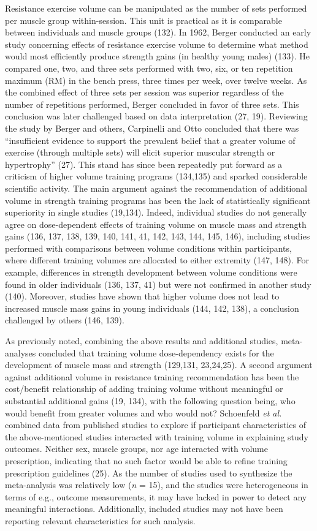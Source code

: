 \documentclass[twoside,10pt]{gihclass} %
\begin{document}
Resistance exercise volume can be manipulated as the number of sets performed per muscle group within-session. This unit is practical as it is comparable between individuals and muscle groups (132).
In 1962, Berger conducted an early study concerning effects of resistance exercise volume to determine what method would most efficiently produce strength gains (in healthy young males) (133). He compared one, two, and three sets performed with two, six, or ten repetition maximum (RM) in the bench press, three times per week, over twelve weeks. As the combined effect of three sets per session was superior regardless of the number of repetitions performed, Berger concluded in favor of three sets. This conclusion was later challenged based on data interpretation
(27, 19).
Reviewing the study by Berger and others, Carpinelli and Otto concluded that there was ``insufficient evidence to support the prevalent belief that a greater volume of exercise (through multiple sets) will elicit superior muscular strength or hypertrophy'' (27). This stand has since been repeatedly put forward as a criticism of higher volume training programs
(134,135) and sparked considerable scientific activity.
The main argument against the recommendation of additional volume in strength training programs has been the lack of statistically significant superiority in single studies (19,134).
Indeed, individual studies do not generally agree on dose-dependent effects of training volume on muscle mass and strength gains
(136, 137, 138, 139, 140, 141, 41, 142, 143, 144, 145, 146),
including studies performed with comparisons between volume conditions within participants, where different training volumes are allocated to either extremity
(147, 148).
For example, differences in strength development between volume conditions were found in older individuals
(136, 137, 41)
but were not confirmed in another study
(140).
Moreover, studies have shown that higher volume does not lead to increased muscle mass gains in young individuals
(144, 142, 138),
a conclusion challenged by others
(146, 139).

As previously noted, combining the above results and additional studies, meta-analyses concluded that training volume dose-dependency exists for the development of muscle mass and strength
(129,131, 23,24,25).
A second argument against additional volume in resistance training recommendation has been the cost/benefit relationship of adding training volume without meaningful or substantial additional gains
(19, 134),
with the following question being, who would benefit from greater volumes and who would not?
Schoenfeld \emph{et al.} combined data from published studies to explore if participant characteristics of the above-mentioned studies interacted with training volume in explaining study outcomes. Neither sex, muscle groups, nor age interacted with volume prescription, indicating that no such factor would be able to refine training prescription guidelines
(25).
As the number of studies used to synthesize the meta-analysis was relatively low (\emph{n} = 15), and the studies were heterogeneous in terms of e.g., outcome measurements, it may have lacked in power to detect any meaningful interactions. Additionally, included studies may not have been reporting relevant characteristics for such analysis.
\end{document}
